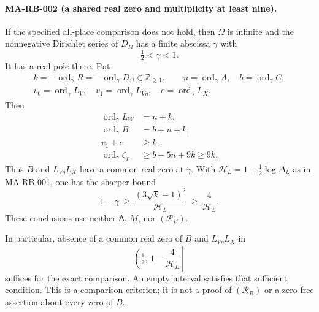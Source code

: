 \paragraph{MA-RB-002 (a shared real zero and multiplicity at least nine).}
If the specified all-place comparison does not hold, then
\(\Omega\) is infinite and the nonnegative Dirichlet series of
\(D_\Omega\) has a finite abscissa \(\gamma\) with
\[
                 \tfrac12<\gamma<1.
 \tag{MA-RB.18}
\]
It has a real pole there.  Put
\[
 \begin{gathered}
 k=-\operatorname{ord}_\gamma R
     =-\operatorname{ord}_\gamma D_\Omega\in\mathbb Z_{\ge1},
 \qquad n=\operatorname{ord}_\gamma A,\quad
 b=\operatorname{ord}_\gamma C,\\
 v_0=\operatorname{ord}_\gamma L_V,\quad
 v_1=\operatorname{ord}_\gamma L_{V\eta},\quad
 e=\operatorname{ord}_\gamma L_X .
 \end{gathered}
 \tag{MA-RB.19}
\]
Then
\[
 \begin{aligned}
 \operatorname{ord}_\gamma L_W&=n+k,\\
 \operatorname{ord}_\gamma B&=b+n+k,\\
 v_1+e&\ge k,\\
 \operatorname{ord}_\gamma\zeta_L&\ge b+5n+9k\ge9k .
 \end{aligned}
 \tag{MA-RB.20}
\]
Thus \(B\) and \(L_{V\eta}L_X\) have a common real zero at
\(\gamma\).  With \(\mathcal H_L=1+\frac12\log\Delta_L\)
as in MA-RB-001, one has the sharper bound
\[
       1-\gamma\ \ge\
                \frac{(3\sqrt{k}-1)^2}{\mathcal H_L}
                       \ \ge\ \frac4{\mathcal H_L}.
 \tag{MA-RB.21}
\]
These conclusions use neither \(\mathsf A\), \(M\), nor
\((\mathcal R_B)\).

In particular, absence of a common real zero of
\(B\) and \(L_{V\eta}L_X\) in
\[
                 \left(\tfrac12,\,1-\frac4{\mathcal H_L}\right]
 \tag{MA-RB.22}
\]
suffices for the exact comparison.
An empty interval satisfies that sufficient condition.
This is a comparison criterion; it is not a proof of
\((\mathcal R_B)\) or a zero-free assertion about every
zero of \(B\).

